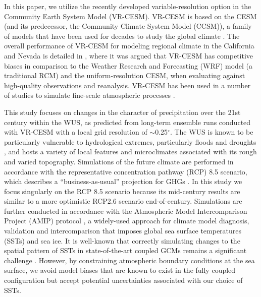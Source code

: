 \documentclass{ametsoc}
\begin{document}
In this paper, we utilize the recently developed variable-resolution option in the Community Earth System Model (VR-CESM).  VR-CESM is based on the CESM (and its predecessor, the Community Climate System Model (CCSM)), a family of models that have been used for decades to study the global climate \citep{neale2010description, hurrell2013community}.  The overall performance of VR-CESM for modeling regional climate in the California and Nevada is detailed in \cite{huang2016evaluation}, where it was argued that VR-CESM has competitive biases in comparison to the Weather Research and Forecasting (WRF) model (a traditional RCM) and the uniform-resolution CESM, when evaluating against high-quality observations and reanalysis. VR-CESM has been used in a number of studies to simulate fine-scale atmospheric processes  \citep{zarzycki2014using, zarzycki2015effects, rhoades2015characterizing, huang2016irrigation, rhoades2016projecting}.


This study focuses on changes in the character of precipitation over the 21st century within the WUS, as predicted from long-term ensemble runs conducted with VR-CESM with a local grid resolution of $\sim$0.25$^\circ$.  The WUS is known to be particularly vulnerable to hydrological extremes, particularly floods and droughts \citep{leung2003hydroclimate, caldwell2010california}, and hosts a variety of local features and microclimates associated with its rough and varied topography.  Simulations of the future climate are performed in accordance with the representative concentration pathway (RCP) 8.5 scenario, which describes a ``business-as-usual'' projection for GHGs \citep{riahi2011rcp}.  In this study we focus singularly on the RCP 8.5 scenario because its mid-century results are similar to a more optimistic RCP2.6 scenario end-of-century.  Simulations are further conducted in accordance with the Atmospheric Model Intercomparison Project (AMIP) protocol \citep{Gates1992}, a widely-used approach for climate model diagnosis, validation and intercomparison that imposes global sea surface temperatures (SSTs) and sea ice.  It is well-known that correctly simulating changes to the spatial pattern of SSTs in state-of-the-art coupled GCMs remains a significant challenge \citep{joseph2006enso, stevenson2012significant, jha2014sst, taschetto2014cold}.  However, by constraining atmospheric boundary conditions at the sea surface, we avoid model biases that are known to exist in the fully coupled configuration \citep{grodsky2012tropical, small2014new} but accept potential uncertainties associated with our choice of SSTs.
\end{document}
